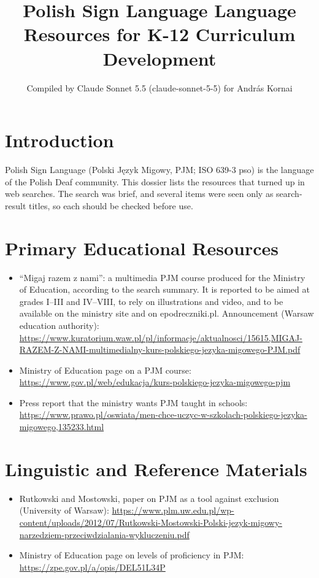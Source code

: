\documentclass[12pt]{article}
\title{Polish Sign Language Language Resources for K-12 Curriculum Development}
\author{Compiled by Claude Sonnet 5.5 (claude-sonnet-5-5) for Andr\'as Kornai}
\date{}
\begin{document}
\maketitle

\section{Introduction}
Polish Sign Language (Polski J\k{e}zyk Migowy, PJM; ISO 639-3 pso) is the language of the Polish Deaf community. This dossier lists the resources that turned up in web searches. The search was brief, and several items were seen only as search-result titles, so each should be checked before use.

\section{Primary Educational Resources}
\begin{itemize}
\item ``Migaj razem z nami'': a multimedia PJM course produced for the Ministry of Education, according to the search summary. It is reported to be aimed at grades I--III and IV--VIII, to rely on illustrations and video, and to be available on the ministry site and on epodreczniki.pl. Announcement (Warsaw education authority): \url{https://www.kuratorium.waw.pl/pl/informacje/aktualnosci/15615,MIGAJ-RAZEM-Z-NAMI-multimedialny-kurs-polskiego-jezyka-migowego-PJM.pdf}
\item Ministry of Education page on a PJM course: \url{https://www.gov.pl/web/edukacja/kurs-polskiego-jezyka-migowego-pjm}
\item Press report that the ministry wants PJM taught in schools: \url{https://www.prawo.pl/oswiata/men-chce-uczyc-w-szkolach-polskiego-jezyka-migowego,135233.html}
\end{itemize}

\section{Linguistic and Reference Materials}
\begin{itemize}
\item Rutkowski and Mostowski, paper on PJM as a tool against exclusion (University of Warsaw): \url{https://www.plm.uw.edu.pl/wp-content/uploads/2012/07/Rutkowski-Mostowski-Polski-jezyk-migowy-narzedziem-przeciwdzialania-wykluczeniu.pdf}
\item Ministry of Education page on levels of proficiency in PJM: \url{https://zpe.gov.pl/a/opis/DEL51L34P}
\end{itemize}
\end{document}
